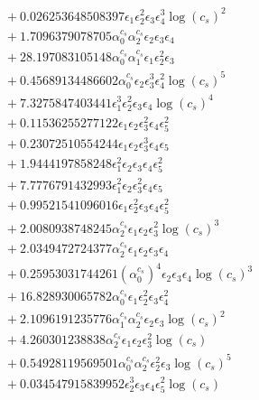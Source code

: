 \documentclass[10pt]{article}
\begin{document}
\begin{align*}
&{}  + 0.026253648508397 \epsilon_{1} \epsilon_{2}^{2} \epsilon_{3} \epsilon_{4}^{3} \log{\left(c_{s} \right)}^{2} \\
&{}  + 1.7096379078705 \alpha_{0}^{c_s} \alpha_{2}^{c_s} \epsilon_{2} \epsilon_{3} \epsilon_{4} \\
&{}  + 28.197083105148 \alpha_{0}^{c_s} \alpha_{1}^{c_s} \epsilon_{1} \epsilon_{2}^{2} \epsilon_{3} \\
&{}  + 0.45689134486602 \alpha_{0}^{c_s} \epsilon_{2} \epsilon_{3}^{3} \epsilon_{4}^{2} \log{\left(c_{s} \right)}^{5} \\
&{}  + 7.3275847403441 \epsilon_{1}^{3} \epsilon_{2}^{2} \epsilon_{3} \epsilon_{4} \log{\left(c_{s} \right)}^{4} \\
&{}  + 0.11536255277122 \epsilon_{1} \epsilon_{2} \epsilon_{3}^{2} \epsilon_{4} \epsilon_{5}^{2} \\
&{}  + 0.23072510554244 \epsilon_{1} \epsilon_{2} \epsilon_{3}^{3} \epsilon_{4} \epsilon_{5} \\
&{}  + 1.9444197858248 \epsilon_{1}^{2} \epsilon_{2} \epsilon_{3} \epsilon_{4} \epsilon_{5}^{2} \\
&{}  + 7.7776791432993 \epsilon_{1}^{2} \epsilon_{2} \epsilon_{3}^{2} \epsilon_{4} \epsilon_{5} \\
&{}  + 0.99521541096016 \epsilon_{1} \epsilon_{2}^{2} \epsilon_{3} \epsilon_{4} \epsilon_{5}^{2} \\
&{}  + 2.0080938748245 \alpha_{2}^{c_s} \epsilon_{1} \epsilon_{2} \epsilon_{3}^{2} \log{\left(c_{s} \right)}^{3} \\
&{}  + 2.0349472724377 \alpha_{2}^{c_s} \epsilon_{1} \epsilon_{2} \epsilon_{3} \epsilon_{4} \\
&{}  + 0.25953031744261 \left(\alpha_{0}^{c_s}\right)^{4} \epsilon_{2} \epsilon_{3} \epsilon_{4} \log{\left(c_{s} \right)}^{3} \\
&{}  + 16.828930065782 \alpha_{0}^{c_s} \epsilon_{1} \epsilon_{2}^{2} \epsilon_{3} \epsilon_{4}^{2} \\
&{}  + 2.1096191235776 \alpha_{1}^{c_s} \alpha_{2}^{c_s} \epsilon_{2} \epsilon_{3} \log{\left(c_{s} \right)}^{2} \\
&{}  + 4.260301238838 \alpha_{2}^{c_s} \epsilon_{1} \epsilon_{2} \epsilon_{3}^{2} \log{\left(c_{s} \right)} \\
&{}  + 0.54928119569501 \alpha_{0}^{c_s} \alpha_{2}^{c_s} \epsilon_{2}^{2} \epsilon_{3} \log{\left(c_{s} \right)}^{5} \\
&{}  + 0.034547915839952 \epsilon_{2}^{3} \epsilon_{3} \epsilon_{4} \epsilon_{5}^{2} \log{\left(c_{s} \right)} \\

\end{align*}
\end{document}
